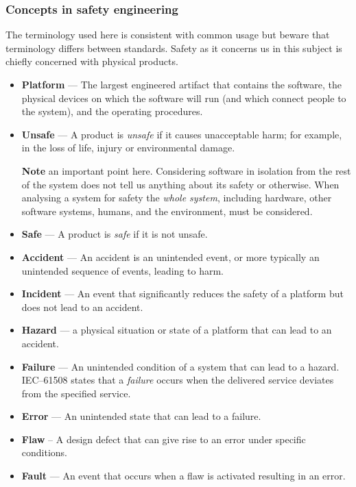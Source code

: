 \subsubsection*{Concepts in safety engineering}
  
 The terminology used here is consistent with common usage but beware that terminology differs between standards.
 Safety as it concerns us in this subject is chiefly concerned with physical products.

\begin{itemize}

\item  {\bf Platform} --- The largest engineered artifact that contains the software, the physical devices on which the software will run (and which connect people to the system), and the operating procedures.

\item {\bf Unsafe} --- A product is \emph{unsafe} if it causes unacceptable harm; for
  example, in the loss of life, injury or environmental damage.

{\bf Note} an important point here. Considering software in
isolation from the rest of the system does not tell us anything about
its safety or otherwise. When analysing a system for safety the \emph{whole system}, including hardware, other software systems, humans, and the environment, must be considered.

\item \textbf{Safe} --- A product is \emph{safe} if it is not unsafe.

\item {\bf Accident} --- An accident is an unintended event, or more
  typically an unintended sequence of events, leading to harm.

\item {\bf Incident} --- An event that significantly reduces the safety of
  a platform but does not lead to an accident.

  \item {\bf Hazard} ---   a physical situation or state of a platform that can lead to an
    accident.

 \item \textbf{Failure} --- An unintended condition of a system that can lead
  to a hazard.  IEC--61508 states that a \emph{failure} occurs when
  the delivered service deviates from the specified service.

 \item \textbf{Error} --- An unintended state that can lead to a failure.
    
  \item \textbf{Flaw} -- A design defect that can give rise to an error under specific conditions.
    
\item \textbf{Fault} --- An event that occurs when a flaw is activated
  resulting in an error.

\end{itemize}

